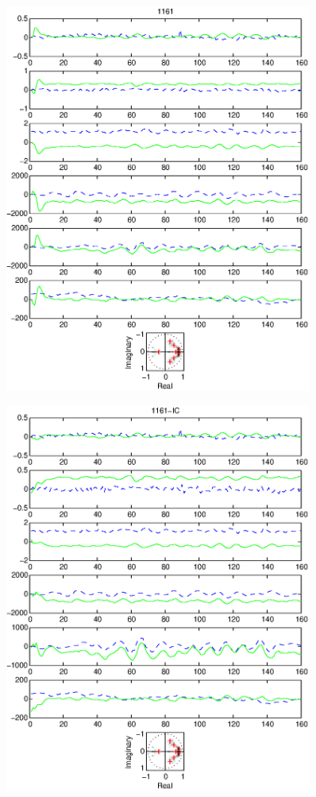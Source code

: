 \documentclass{article}
\begin{document}
\begin{figure}[htb!]
\centering
\includegraphics[width=0.9\textwidth]{1161.eps}
\end{figure}\clearpage
\begin{figure}[htb!]
\centering
\includegraphics[width=0.9\textwidth]{1161_ic.eps}
\end{figure}\clearpage
\end{document}
